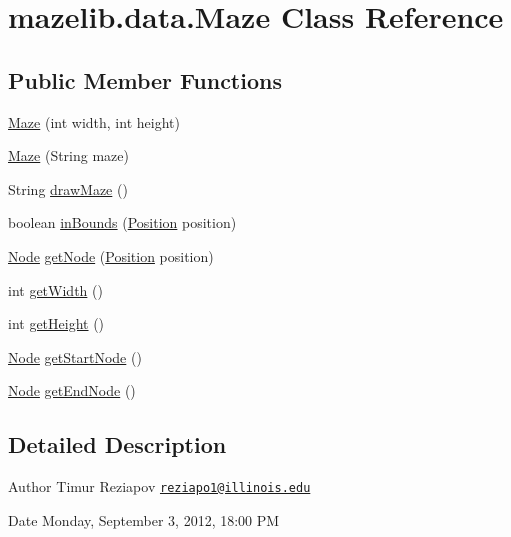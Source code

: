 \hypertarget{classmazelib_1_1data_1_1_maze}{\section{mazelib.\-data.\-Maze Class Reference}
\label{classmazelib_1_1data_1_1_maze}
}
\subsection*{Public Member Functions}
\begin{DoxyCompactItemize}
\item 
\hyperlink{classmazelib_1_1data_1_1_maze_a8fbac7d6a990f2a4dc0f7a6e9548e021}{Maze} (int width, int height)
\item 
\hyperlink{classmazelib_1_1data_1_1_maze_a6108ac1177218d391d9441a14211c338}{Maze} (String maze)
\item 
String \hyperlink{classmazelib_1_1data_1_1_maze_a01357f91230e3ab0f5b5d2bae333775b}{draw\-Maze} ()
\item 
boolean \hyperlink{classmazelib_1_1data_1_1_maze_a5abf2461af90321c99b60d6d7b6baa2e}{in\-Bounds} (\hyperlink{classmazelib_1_1data_1_1_position}{Position} position)
\item 
\hyperlink{classmazelib_1_1data_1_1_node}{Node} \hyperlink{classmazelib_1_1data_1_1_maze_a4f1d235fd8c7bc3f8afab258b511087f}{get\-Node} (\hyperlink{classmazelib_1_1data_1_1_position}{Position} position)
\item 
int \hyperlink{classmazelib_1_1data_1_1_maze_ad6d361bb62158a9613f29108651963d4}{get\-Width} ()
\item 
int \hyperlink{classmazelib_1_1data_1_1_maze_a119104038e76e9793cce077726685e0c}{get\-Height} ()
\item 
\hyperlink{classmazelib_1_1data_1_1_node}{Node} \hyperlink{classmazelib_1_1data_1_1_maze_acb1b8d241380c174d45540d6185c151d}{get\-Start\-Node} ()
\item 
\hyperlink{classmazelib_1_1data_1_1_node}{Node} \hyperlink{classmazelib_1_1data_1_1_maze_a72da72ea9a5d7acfea2d759fa6df83c0}{get\-End\-Node} ()
\end{DoxyCompactItemize}


\subsection{Detailed Description}
\begin{DoxyAuthor}{Author}
Timur Reziapov \href{mailto:reziapo1@illinois.edu}{\tt reziapo1@illinois.\-edu} 
\end{DoxyAuthor}
\begin{DoxyDate}{Date}
Monday, September 3, 2012, 18\-:00 P\-M 
\end{DoxyDate}


